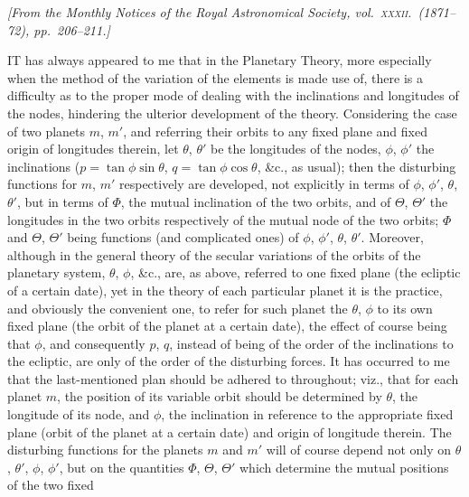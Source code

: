 \documentclass[11pt]{article}
\begin{document}
\medskip

\noindent\textit{[From the Monthly Notices of the Royal Astronomical
Society, vol.~\textsc{xxxii}.\ (1871--72), pp.~206--211.]}

\bigskip

IT has always appeared to me that in the Planetary Theory, more
especially when the method of the variation of the elements is made use
of, there is a difficulty as to the proper mode of dealing with the
inclinations and longitudes of the nodes, hindering the ulterior
development of the theory. Considering the case of two planets $m$,
$m'$, and referring their orbits to any fixed plane and fixed origin of
longitudes therein, let $\theta$, $\theta'$ be the longitudes of the
nodes, $\phi$, $\phi'$ the inclinations ($p=\tan\phi\sin\theta$,
$q=\tan\phi\cos\theta$, \&c., as usual); then the disturbing functions
for $m$, $m'$ respectively are developed, not explicitly in terms of
$\phi$, $\phi'$, $\theta$, $\theta'$, but in terms of $\Phi$, the mutual
inclination of the two orbits, and of $\Theta$, $\Theta'$ the longitudes
in the two orbits respectively of the mutual node of the two orbits;
$\Phi$ and $\Theta$, $\Theta'$ being functions (and complicated ones) of
$\phi$, $\phi'$, $\theta$, $\theta'$. Moreover, although in the general
theory of the secular variations of the orbits of the planetary system,
$\theta$, $\phi$, \&c., are, as above, referred to one fixed plane (the
ecliptic of a certain date), yet in the theory of each particular planet
it is the practice, and obviously the convenient one, to refer for such
planet the $\theta$, $\phi$ to its own fixed plane (the orbit of the
planet at a certain date), the effect of course being that $\phi$, and
consequently $p$, $q$, instead of being of the order of the inclinations
to the ecliptic, are only of the order of the disturbing forces. It has
occurred to me that the last-mentioned plan should be adhered to
throughout; viz., that for each planet $m$, the position of its variable
orbit should be determined by $\theta$, the longitude of its node, and
$\phi$, the inclination in reference to the appropriate fixed plane
(orbit of the planet at a certain date) and origin of longitude therein.
The disturbing functions for the planets $m$ and $m'$ will of course
depend not only on $\theta$, $\theta'$, $\phi$, $\phi'$, but on the
quantities $\Phi$, $\Theta$, $\Theta'$ which determine the mutual
positions of the two fixed

\end{document}
